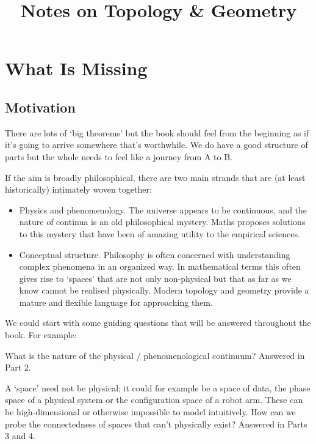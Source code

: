 \documentclass[oneside,english]{amsbook}
\numberwithin{section}{chapter}
\theoremstyle{plain}
\theoremstyle{definition}
\begin{document}
\title{Notes on Topology \& Geometry}

\maketitle

\tableofcontents

\chapter*{What Is Missing}


\section{Motivation}

There are lots of `big theorems' but the book should feel from the beginning as if it's going to arrive somewhere that's worthwhile. We do have a good structure of parts but the whole needs to feel like a journey from A to B.

If the aim is broadly philosophical, there are two main strands that are (at least historically) intimately woven together:
\begin{itemize}
	\item{Physics and phenomenology. The universe appears to be continuous, and the nature of continua is an old philosophical mystery. Maths proposes solutions to this mystery that have been of amazing utility to the empirical sciences.}
	\item{Conceptual structure. Philosophy is often concerned with understanding complex phenomena in an organized way. In mathematical terms this often gives rise to `spaces' that are not only non-physical but that as far as we know cannot be realised physically. Modern topology and geometry provide a mature and flexible language for approaching them.}
\end{itemize}

We could start with some guiding questions that will be answered throughout the book. For example: 

What is the nature of the physical / phenomenological continuum? Answered in Part 2.

A `space' need not be physical; it could for example be a space of data, the phase space of a physical system or the configuration space of a robot arm. These can be high-dimensional or otherwise impossible to model intuitively. How can we probe the connectedness of spaces that can't physically exist? Answered in Parts 3 and 4.
\end{document}
